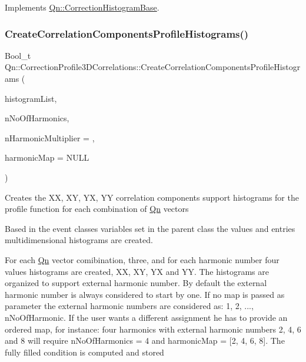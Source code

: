 Implements \mbox{\hyperlink{classQn_1_1CorrectionHistogramBase_a4db2c92ceaffefaa91475a721612d80d}{Qn\+::\+Correction\+Histogram\+Base}}.

\mbox{\label{classQn_1_1CorrectionProfile3DCorrelations_aac1dd44c1c32c8e017c97cbac5cd911c}} 
\subsubsection{\texorpdfstring{Create\+Correlation\+Components\+Profile\+Histograms()}{CreateCorrelationComponentsProfileHistograms()}}
{\footnotesize\ttfamily Bool\+\_\+t Qn\+::\+Correction\+Profile3\+D\+Correlations\+::\+Create\+Correlation\+Components\+Profile\+Histograms (\begin{DoxyParamCaption}\item[{T\+List $\ast$}]{histogram\+List,  }\item[{Int\+\_\+t}]{n\+No\+Of\+Harmonics,  }\item[{Int\+\_\+t}]{n\+Harmonic\+Multiplier = {},  }\item[{Int\+\_\+t $\ast$}]{harmonic\+Map = {\ttfamily NULL} }\end{DoxyParamCaption})}

Creates the XX, XY, YX, YY correlation components support histograms for the profile function for each combination of \mbox{\hyperlink{namespaceQn}{Qn}} vectors

Based in the event classes variables set in the parent class the values and entries multidimensional histograms are created.

For each \mbox{\hyperlink{namespaceQn}{Qn}} vector comibination, three, and for each harmonic number four values histograms are created, XX, XY, YX and YY. The histograms are organized to support external harmonic number. By default the external harmonic number is always considered to start by one. If no map is passed as parameter the external harmonic numbers are considered as\+: 1, 2, ..., n\+No\+Of\+Harmonic. If the user wants a different assignment he has to provide an ordered map, for instance\+: four harmonics with external harmonic numbers 2, 4, 6 and 8 will require n\+No\+Of\+Harmonics = 4 and harmonic\+Map = \mbox{[}2, 4, 6, 8\mbox{]}. The fully filled condition is computed and stored

